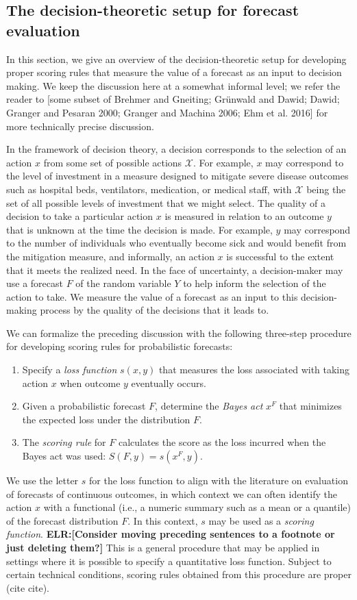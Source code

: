 \documentclass{article}
\def\elr#1{{\color{cyan}\textbf{ELR:[#1]}}}
\begin{document}
\subsection{The decision-theoretic setup for forecast evaluation}
\label{sec:methods.decisiontheory}

In this section, we give an overview of the decision-theoretic setup for developing proper scoring rules that measure the value of a forecast as an input to decision making. We keep the discussion here at a somewhat informal level; we refer the reader to [some subset of Brehmer and Gneiting; Grünwald and Dawid; Dawid; Granger and Pesaran 2000; Granger and Machina 2006; Ehm et al. 2016] for more technically precise discussion.

In the framework of decision theory, a decision corresponds to the selection of an action $x$ from some set of possible actions $\mathcal{X}$. For example, $x$ may correspond to the level of investment in a measure designed to mitigate severe disease outcomes such as hospital beds, ventilators, medication, or medical staff, with $\mathcal{X}$ being the set of all possible levels of investment that we might select. The quality of a decision to take a particular action $x$ is measured in relation to an outcome $y$ that is unknown at the time the decision is made. For example, $y$ may correspond to the number of individuals who eventually become sick and would benefit from the mitigation measure, and informally, an action $x$ is successful to the extent that it meets the realized need. In the face of uncertainty, a decision-maker may use a forecast $F$ of the random variable $Y$ to help inform the selection of the action to take. We measure the value of a forecast as an input to this decision-making process by the quality of the decisions that it leads to.

We can formalize the preceding discussion with the following three-step procedure for developing scoring rules for probabilistic forecasts:
\begin{enumerate}
\item Specify a \emph{loss function} $s(x, y)$ that measures the loss associated with taking action $x$ when outcome $y$ eventually occurs.
\item Given a probabilistic forecast $F$, determine the \emph{Bayes act} $x^F$ that minimizes the expected loss under the distribution $F$.
\item The \emph{scoring rule} for $F$ calculates the score as the loss incurred when the Bayes act was used: $S(F, y) = s(x^F, y)$.
\end{enumerate}
We use the letter $s$ for the loss function to align with the literature on evaluation of forecasts of continuous outcomes, in which context we can often identify the action $x$ with a functional (i.e., a numeric summary such as a mean or a quantile) of the forecast distribution $F$. In this context, $s$ may be used as a \emph{scoring function}. \elr{Consider moving preceding sentences to a footnote or just deleting them?}
This is a general procedure that may be applied in settings where it is possible to specify a quantitative loss function. Subject to certain technical conditions, scoring rules obtained from this procedure are proper (cite cite).
\end{document}
